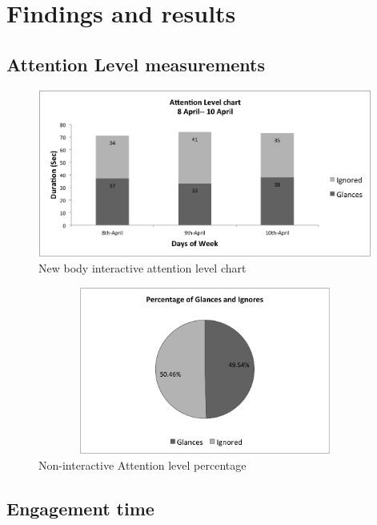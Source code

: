\section{Findings and results}



\subsection{Attention Level measurements}

\begin{figure}[H]
    \centering
    \includegraphics[width=110mm,height=55mm]{Figures/9/newbody_Inter_chart}%
    \caption{New body interactive attention level chart}%
    \label{fig:newbodyattentionlevelchart}%
\end{figure}



\begin{figure}[H]
    \centering
    \includegraphics[width=110mm,height=55mm]{Figures/9/newbody_inter_percentage}
    \caption{Non-interactive Attention level percentage}%
    \label{fig:Nonattentionlevelpercentage}%
\end{figure}



\subsection{Engagement time}

